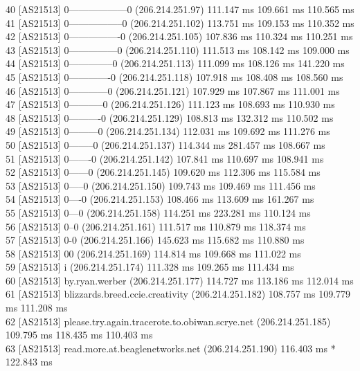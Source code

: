 \documentclass[11pt]{article}
\begin{document}
40  [AS21513] 0------------------0 (206.214.251.97)  111.147 ms  109.661 ms  110.565 ms\\
41  [AS21513] 0-----------------0 (206.214.251.102)  113.751 ms  109.153 ms  110.352 ms\\
42  [AS21513] 0----------------0 (206.214.251.105)  107.836 ms  110.324 ms  110.251 ms\\
43  [AS21513] 0---------------0 (206.214.251.110)  111.513 ms  108.142 ms  109.000 ms\\
44  [AS21513] 0--------------0 (206.214.251.113)  111.099 ms  108.126 ms  141.220 ms\\
45  [AS21513] 0-------------0 (206.214.251.118)  107.918 ms  108.408 ms  108.560 ms\\
46  [AS21513] 0------------0 (206.214.251.121)  107.929 ms  107.867 ms  111.001 ms\\
47  [AS21513] 0-----------0 (206.214.251.126)  111.123 ms  108.693 ms  110.930 ms\\
48  [AS21513] 0----------0 (206.214.251.129)  108.813 ms  132.312 ms  110.502 ms\\
49  [AS21513] 0---------0 (206.214.251.134)  112.031 ms  109.692 ms  111.276 ms\\
50  [AS21513] 0--------0 (206.214.251.137)  114.344 ms  281.457 ms  108.667 ms\\
51  [AS21513] 0-------0 (206.214.251.142)  107.841 ms  110.697 ms  108.941 ms\\
52  [AS21513] 0------0 (206.214.251.145)  109.620 ms  112.306 ms  115.584 ms\\
53  [AS21513] 0-----0 (206.214.251.150)  109.743 ms  109.469 ms  111.456 ms\\
54  [AS21513] 0----0 (206.214.251.153)  108.466 ms  113.609 ms  161.267 ms\\
55  [AS21513] 0---0 (206.214.251.158)  114.251 ms  223.281 ms  110.124 ms\\
56  [AS21513] 0--0 (206.214.251.161)  111.517 ms  110.879 ms  118.374 ms\\
57  [AS21513] 0-0 (206.214.251.166)  145.623 ms  115.682 ms  110.880 ms\\
58  [AS21513] 00 (206.214.251.169)  114.814 ms  109.668 ms  111.022 ms\\
59  [AS21513] i (206.214.251.174)  111.328 ms  109.265 ms  111.434 ms\\
60  [AS21513] by.ryan.werber (206.214.251.177)  114.727 ms  113.186 ms  112.014 ms\\
61  [AS21513] blizzards.breed.ccie.creativity (206.214.251.182)  108.757 ms  109.779 ms  111.208 ms\\
62  [AS21513] please.try.again.tracerote.to.obiwan.scrye.net (206.214.251.185)  109.795 ms  118.435 ms  110.403 ms\\
63  [AS21513] read.more.at.beaglenetworks.net (206.214.251.190)  116.403 ms *  122.843 ms\\
\end{document}
